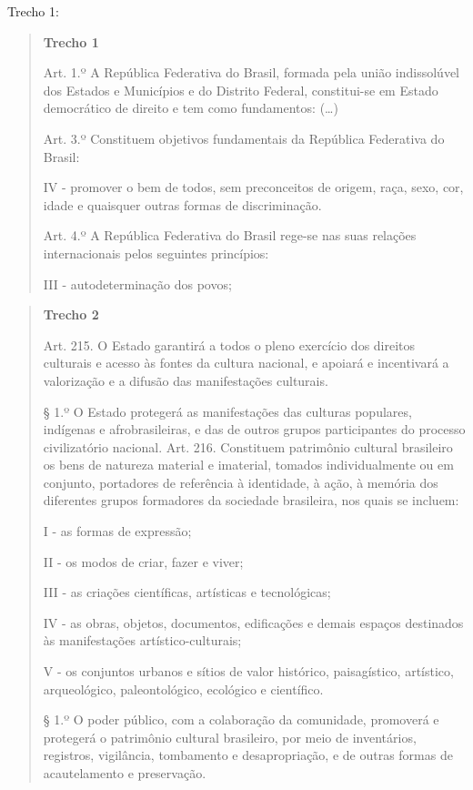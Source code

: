 {Trecho 1:

\begin{quote}

\textbf{Trecho 1}

Art. 1.º A República Federativa do Brasil, formada pela união
indissolúvel dos Estados e Municípios e do Distrito Federal,
constitui-se em Estado democrático de direito e tem como fundamentos: (\ldots{})

Art. 3.º Constituem objetivos fundamentais da República Federativa do
Brasil:

IV - promover o bem de todos, sem preconceitos de origem, raça, sexo,
cor, idade e quaisquer outras formas de discriminação.

Art. 4.º A República Federativa do Brasil rege-se nas suas relações
internacionais pelos seguintes princípios:

III - autodeterminação dos povos;

\end{quote}


\begin{quote}
\textbf{Trecho 2}

Art. 215. O Estado garantirá a todos o pleno exercício dos direitos
culturais e acesso às fontes da cultura nacional, e apoiará e
incentivará a valorização e a difusão das manifestações culturais.

§ 1.º O Estado protegerá as manifestações das culturas populares,
indígenas e afrobrasileiras, e das de outros grupos participantes do
processo civilizatório nacional. Art. 216. Constituem patrimônio
cultural brasileiro os bens de natureza material e imaterial, tomados
individualmente ou em conjunto, portadores de referência à identidade, à
ação, à memória dos diferentes grupos formadores da sociedade
brasileira, nos quais se incluem:

I - as formas de expressão;

II - os modos de criar, fazer e viver;

III - as criações científicas, artísticas e tecnológicas;

IV - as obras, objetos, documentos, edificações e demais espaços
destinados às manifestações artístico-culturais;

V - os conjuntos urbanos e sítios de valor histórico, paisagístico,
artístico, arqueológico, paleontológico, ecológico e científico.

§ 1.º O poder público, com a colaboração da comunidade, promoverá e
protegerá o patrimônio cultural brasileiro, por meio de inventários,
registros, vigilância, tombamento e desapropriação, e de outras formas
de acautelamento e preservação. \\


\end{quote}}

